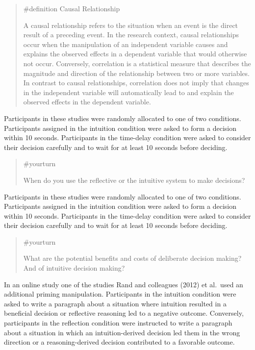 \documentclass[
  letterpaper,
]{book}
\begin{document}
\begin{quote}
\label{def-causal}{\#definition} Causal Relationship

A causal relationship refers to the situation when an event is the
direct result of a preceding event. In the research context, causal
relationships occur when the manipulation of an independent variable
causes and explains the observed effects in a dependent variable that
would otherwise not occur. Conversely, correlation is a statistical
measure that describes the magnitude and direction of the relationship
between two or more variables. In contrast to causal relationships,
correlation does not imply that changes in the independent variable will
automatically lead to and explain the observed effects in the dependent
variable.
\end{quote}

Participants in these studies were randomly allocated to one of two
conditions. Participants assigned in the intuition condition were asked
to form a decision within 10 seconds. Participants in the time-delay
condition were asked to consider their decision carefully and to wait
for at least 10 seconds before deciding.

\begin{quote}
{\#yourturn}

When do you use the reflective or the intuitive system to make
decisions?
\end{quote}

Participants in these studies were randomly allocated to one of two
conditions. Participants assigned in the intuition condition were asked
to form a decision within 10 seconds. Participants in the time-delay
condition were asked to consider their decision carefully and to wait
for at least 10 seconds before deciding.

\begin{quote}
{\#yourturn}

What are the potential benefits and costs of deliberate decision making?
And of intuitive decision making?
\end{quote}

In an online study one of the studies Rand and colleagues (2012) et
al.~used an additional priming manipulation. Participants in the
intuition condition were asked to write a paragraph about a situation
where intuition resulted in a beneficial decision or reflective
reasoning led to a negative outcome. Conversely, participants in the
reflection condition were instructed to write a paragraph about a
situation in which an intuition-derived decision led them in the wrong
direction or a reasoning-derived decision contributed to a favorable
outcome.
\end{document}
